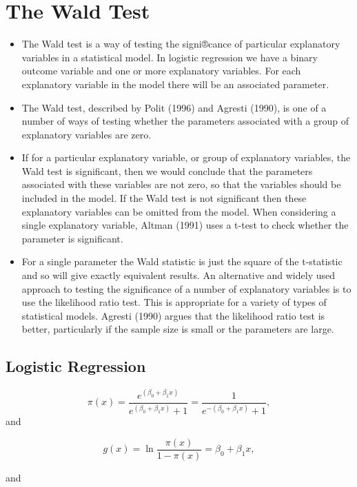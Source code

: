 \documentclass[a4paper,12pt]{article}
\begin{document}
\section*{The Wald Test}

\begin{itemize}
	\item 	The Wald test is a way of testing the signi®cance of particular explanatory variables in a statistical model. In logistic regression we have a binary outcome variable and one or more explanatory variables. For each explanatory variable in the model there will be an associated parameter.
	\item 	The Wald test, described by Polit (1996) and Agresti (1990), is one of a number of ways of testing whether the parameters associated with a group of
	explanatory variables are zero.
	
	\item 	If for a particular explanatory variable, or group of explanatory variables, the Wald test is significant, then we would conclude that the parameters associated with these variables are not zero, so that the variables should be included in the model. If the Wald test is not significant then these explanatory variables can be omitted from the model. When considering a single explanatory variable, Altman (1991) uses a t-test to check whether the parameter is significant. 
	
	\item 		For a single parameter the Wald statistic is just the square of the t-statistic and so will give exactly equivalent results.
	An alternative and widely used approach to testing the significance of a number of explanatory variables is to use the likelihood ratio test. This is
	appropriate for a variety of types of statistical models. Agresti (1990) argues that the likelihood ratio test is better, particularly if the sample size is small or the parameters are large.
\end{itemize}

\subsection{Logistic Regression}

\[ \pi(x) = \frac{e^{(\beta_0 + \beta_1 x)}} {e^{(\beta_0 + \beta_1 x)} + 1} = \frac {1} {e^{-(\beta_0 + \beta_1 x)} + 1},\]
and

\[g(x) = \ln \frac {\pi(x)} {1 - \pi(x)} = \beta_0 + \beta_1 x ,\]

and
\end{document}
